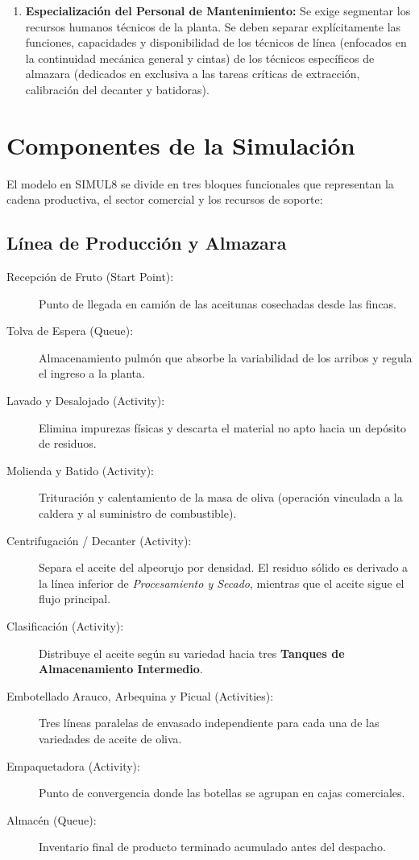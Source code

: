 \documentclass[runningheads]{llncs}
\begin{document}
\begin{enumerate}
    \item \textbf{Especialización del Personal de Mantenimiento:} Se exige segmentar los recursos humanos técnicos de la planta. Se deben separar explícitamente las funciones, capacidades y disponibilidad de los técnicos de línea (enfocados en la continuidad mecánica general y cintas) de los técnicos específicos de almazara (dedicados en exclusiva a las tareas críticas de extracción, calibración del decanter y batidoras).
\end{enumerate}




\section{Componentes de la Simulación}

El modelo en SIMUL8 se divide en tres bloques funcionales que representan la cadena productiva, el sector comercial y los recursos de soporte:

\subsection{Línea de Producción y Almazara}
\begin{description}
    \item[Recepción de Fruto (Start Point):] Punto de llegada en camión de las aceitunas cosechadas desde las fincas.
    \item[Tolva de Espera (Queue):] Almacenamiento pulmón que absorbe la variabilidad de los arribos y regula el ingreso a la planta.
    \item[Lavado y Desalojado (Activity):] Elimina impurezas físicas y descarta el material no apto hacia un depósito de residuos.
    \item[Molienda y Batido (Activity):] Trituración y calentamiento de la masa de oliva (operación vinculada a la caldera y al suministro de combustible).
    \item[Centrifugación / Decanter (Activity):] Separa el aceite del alpeorujo por densidad. El residuo sólido es derivado a la línea inferior de \textit{Procesamiento y Secado}, mientras que el aceite sigue el flujo principal.
    \item[Clasificación (Activity):] Distribuye el aceite según su variedad hacia tres \textbf{Tanques de Almacenamiento Intermedio}.
    \item[Embotellado Arauco, Arbequina y Picual (Activities):] Tres líneas paralelas de envasado independiente para cada una de las variedades de aceite de oliva.
    \item[Empaquetadora (Activity):] Punto de convergencia donde las botellas se agrupan en cajas comerciales.
    \item[Almacén (Queue):] Inventario final de producto terminado acumulado antes del despacho.
\end{description}
\end{document}
